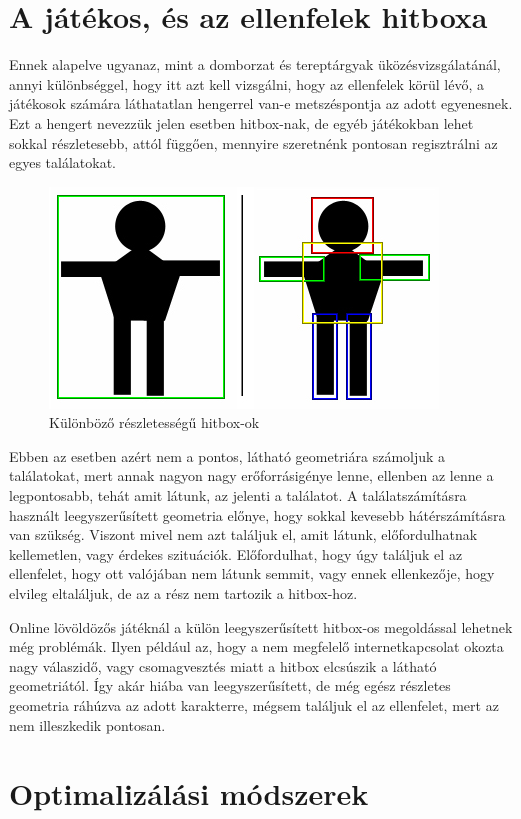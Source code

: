 \section{A játékos, és az ellenfelek hitboxa}


Ennek alapelve ugyanaz, mint a domborzat és tereptárgyak üközésvizsgálatánál, annyi különbséggel, hogy itt azt kell vizsgálni, hogy az ellenfelek körül lévő, a játékosok számára láthatatlan hengerrel van-e metszéspontja az adott egyenesnek. Ezt a hengert nevezzük jelen esetben hitbox-nak, de egyéb játékokban lehet sokkal részletesebb, attól függően, mennyire szeretnénk pontosan regisztrálni az egyes találatokat.

\begin{figure}[h]
\centering
\includegraphics[scale=0.7]{kepek/hitbox.png}
\caption{Különböző részletességű hitbox-ok}
\label{fig:hitbox}
\end{figure}

Ebben az esetben azért nem a pontos, látható geometriára számoljuk a találatokat, mert annak nagyon nagy erőforrásigénye lenne, ellenben az lenne a legpontosabb, tehát amit látunk, az jelenti a találatot. A találatszámításra használt leegyszerűsített geometria előnye, hogy sokkal kevesebb hátérszámításra van szükség. Viszont mivel nem azt találjuk el, amit látunk, előfordulhatnak kellemetlen, vagy érdekes szituációk. Előfordulhat, hogy úgy találjuk el az ellenfelet, hogy ott valójában nem látunk semmit, vagy ennek ellenkezője, hogy elvileg eltaláljuk, de az a rész nem tartozik a hitbox-hoz.

Online lövöldözős játéknál a külön leegyszerűsített hitbox-os megoldással lehetnek még problémák. Ilyen például az, hogy a nem megfelelő internetkapcsolat okozta nagy válaszidő, vagy csomagvesztés miatt a hitbox elcsúszik a látható geometriától. Így akár hiába van leegyszerűsített, de még egész részletes geometria ráhúzva az adott karakterre, mégsem találjuk el az ellenfelet, mert az nem illeszkedik pontosan.

\section{Optimalizálási módszerek}


